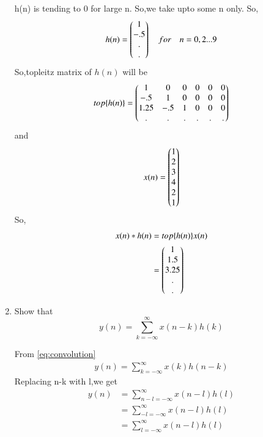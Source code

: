 \documentclass[journal,12pt,twocolumn]{IEEEtran}
\renewcommand\thesection{\arabic{section}}
\begin{document}
\begin{enumerate}[label=\thesection.\arabic*]
h(n) is tending to 0 for large n.
So,we take upto some n only.
So,
\begin{align}
	h(n)=\begin{pmatrix}1\\-.5\\.\\.\end{pmatrix} \quad for \quad n=0,2 ...9
\end{align} 
So,topleitz matrix of $h(n)$ will be
\begin{align}
	top\{h(n)\}=\begin{pmatrix}1& 0& 0 &0 &0 &0\\-.5 &1 &0 &0 &0 &0\\1.25&-.5&1&0&0&0\\. &.& .& .& .&. \end{pmatrix}
\end{align}
and 
\begin{align}
	x(n)=\begin{pmatrix}1\\2\\3\\4\\2\\1\end{pmatrix}
\end{align}
So,
\begin{align}
	x(n)*h(n)&=top\{h(n)\}x(n)\\
	&=\begin{pmatrix}1\\1.5\\3.25\\.\\.\end{pmatrix}
\end{align}
\item Show that
\begin{equation}
y(n) =  \sum_{k=-\infty}^{\infty}x(n-k)h(k)
\end{equation}

\solution From \eqref{eq:convolution}
\begin{align}
	y(n) = \sum_{k=-\infty}^{\infty}x(k)h(n-k)
\end{align}
Replacing n-k with l,we get
\begin{align}
	y(n) &= \sum_{n-l=-\infty}^{\infty}x(n-l)h(l)\\
	&=\sum_{-l=-\infty}^{\infty}x(n-l)h(l)\\
		&=\sum_{l=-\infty}^{\infty}x(n-l)h(l)
\end{align}
\end{enumerate}

%
\end{document}
